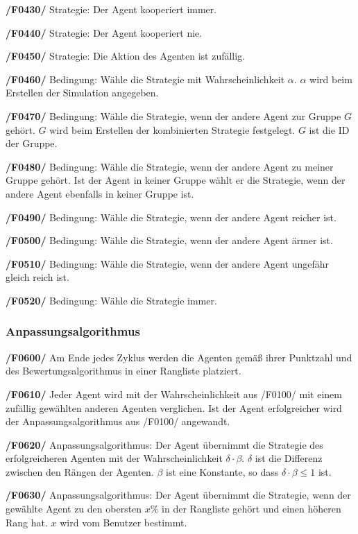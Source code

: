 \textbf{/F0430/} 
Strategie: Der Agent kooperiert immer.

\textbf{/F0440/}
Strategie: Der Agent kooperiert nie.

\textbf{/F0450/}
Strategie: Die Aktion des Agenten ist zufällig.

\textbf{/F0460/}
Bedingung: Wähle die Strategie mit Wahrscheinlichkeit $\alpha$. $\alpha$ wird beim Erstellen der Simulation angegeben.

\textbf{/F0470/}
Bedingung: Wähle die Strategie, wenn der andere Agent zur Gruppe $G$ gehört. $G$ wird beim Erstellen der kombinierten Strategie festgelegt. $G$ ist die ID der Gruppe.

\textbf{/F0480/}
Bedingung: Wähle die Strategie, wenn der andere Agent zu meiner Gruppe gehört. Ist der Agent in keiner Gruppe wählt er die Strategie, wenn der andere Agent ebenfalls in keiner Gruppe ist.

\textbf{/F0490/}
Bedingung: Wähle die Strategie, wenn der andere Agent reicher ist.

\textbf{/F0500/}
Bedingung: Wähle die Strategie, wenn der andere Agent ärmer ist.

\textbf{/F0510/}
Bedingung: Wähle die Strategie, wenn der andere Agent ungefähr gleich reich ist.

\textbf{/F0520/}
Bedingung: Wähle die Strategie immer.

\subsubsection{Anpassungsalgorithmus}

\textbf{/F0600/}
Am Ende jedes Zyklus werden die Agenten gemäß ihrer Punktzahl und des Bewertungsalgorithmus in einer Rangliste platziert.

\textbf{/F0610/}
Jeder Agent wird mit der Wahrscheinlichkeit aus /F0100/ mit einem zufällig gewählten anderen Agenten verglichen. Ist der Agent erfolgreicher wird der Anpassungsalgorithmus aus /F0100/ angewandt.

\textbf{/F0620/}
Anpassungsalgorithmus: Der Agent übernimmt die Strategie des erfolgreicheren Agenten mit der Wahrscheinlichkeit $\delta \cdot \beta$. $\delta$ ist die Differenz zwischen den Rängen der Agenten. $\beta$ ist eine Konstante, so dass $\delta \cdot \beta \leq 1$ ist.

\textbf{/F0630/}
Anpassungsalgorithmus: Der Agent übernimmt die Strategie, wenn der gewählte Agent zu den obersten $x\%$ in der Rangliste gehört und einen höheren Rang hat. $x$ wird vom Benutzer bestimmt.


